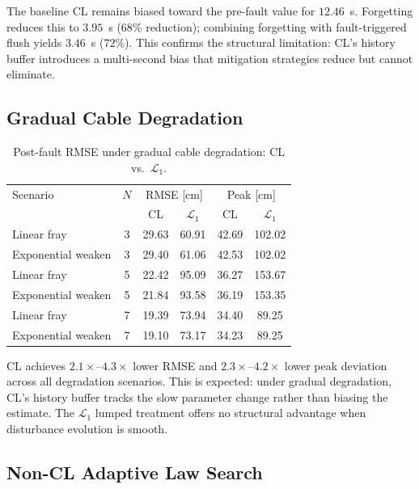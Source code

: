 The baseline CL remains biased toward the pre-fault value for $12.46$~s. Forgetting reduces this to $3.95$~s ($68\%$ reduction); combining forgetting with fault-triggered flush yields $3.46$~s ($72\%$). This confirms the structural limitation: CL's history buffer introduces a multi-second bias that mitigation strategies reduce but cannot eliminate.

\subsection{Gradual Cable Degradation}
\label{supp:degradation}

\begin{table}[t]
\centering
\caption{Post-fault RMSE under gradual cable degradation: CL vs.\ $\mathcal{L}_1$.}
\label{tab:degradation}
\begin{tabular}{lccccc}
\toprule
Scenario & $N$ & \multicolumn{2}{c}{RMSE [cm]} & \multicolumn{2}{c}{Peak [cm]} \\
         &     & CL   & $\mathcal{L}_1$ & CL   & $\mathcal{L}_1$ \\
\midrule
Linear fray        & 3 & 29.63 & 60.91  & 42.69 & 102.02 \\
Exponential weaken & 3 & 29.40 & 61.06  & 42.53 & 102.02 \\
\midrule
Linear fray        & 5 & 22.42 & 95.09  & 36.27 & 153.67 \\
Exponential weaken & 5 & 21.84 & 93.58  & 36.19 & 153.35 \\
\midrule
Linear fray        & 7 & 19.39 & 73.94  & 34.40 & 89.25 \\
Exponential weaken & 7 & 19.10 & 73.17  & 34.23 & 89.25 \\
\bottomrule
\end{tabular}
\end{table}

CL achieves $2.1\times$--$4.3\times$ lower RMSE and $2.3\times$--$4.2\times$ lower peak deviation across all degradation scenarios. This is expected: under gradual degradation, CL's history buffer tracks the slow parameter change rather than biasing the estimate. The $\mathcal{L}_1$ lumped treatment offers no structural advantage when disturbance evolution is smooth.

\subsection{Non-CL Adaptive Law Search}
\label{supp:noncl_search}


